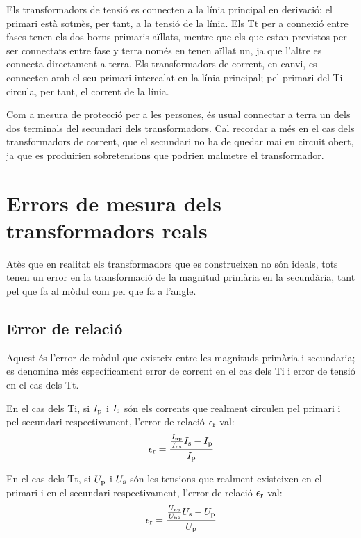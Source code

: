 Els transformadors de tensió es connecten a la línia principal en
derivació; el  primari està sotmès, per tant, a la tensió de la
línia. Els Tt per a connexió entre fases tenen els dos borns
primaris aïllats, mentre que els que estan previstos per ser
connectats entre fase y terra només en tenen aïllat un, ja que
l'altre es connecta directament a terra. Els transformadors de
corrent, en canvi, es connecten amb el seu primari intercalat en la
línia principal;  pel primari del Ti circula, per tant, el corrent
 de la línia.

 Com a mesura de protecció per a les persones, és usual
connectar a terra un dels dos terminals del secundari dels
transformadors. Cal recordar a més en el cas dels transformadors de
corrent, que el secundari no ha de quedar mai en circuit obert, ja
que es produirien sobretensions que podrien malmetre el
transformador.

\section{Errors de mesura dels transformadors reals}

Atès que en realitat els transformadors que es construeixen no són
ideals, tots tenen un error en la transformació de la magnitud
primària en la secundària, tant pel que fa al mòdul com pel que fa
a l'angle.

\subsection{Error de relació}

Aquest és l'error de mòdul que existeix entre les magnituds primària i
secundaria; es denomina més específicament error de corrent en el
cas dels Ti i error de tensió en el cas dels Tt.

En el cas dels Ti, si $I_\mathrm{p}$ i $I_\mathrm{s}$ són els corrents que
realment circulen pel primari i pel secundari respectivament,
l'error de relació $\epsilon_\mathrm{r}$ val:
\begin{equation}
    \epsilon_\mathrm{r} = \frac{\frac{I_\mathrm{np}}{I_\mathrm{ns}} I_\mathrm{s} - I_\mathrm{p}} {I_\mathrm{p}}
\end{equation}

En el cas dels Tt, si $U_\mathrm{p}$ i $U_\mathrm{s}$ són les tensions que
realment existeixen en el primari i en el secundari respectivament,
l'error de relació $\epsilon_\mathrm{r}$ val:
\begin{equation}
    \epsilon_\mathrm{r} = \frac{\frac{U_\mathrm{np}}{U_\mathrm{ns}} U_\mathrm{s} - U_\mathrm{p}} {U_\mathrm{p}}
\end{equation}

